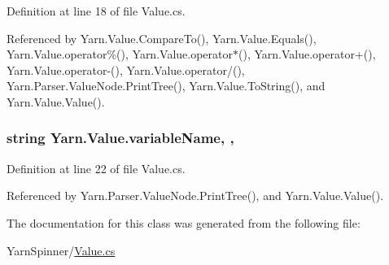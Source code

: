 Definition at line 18 of file Value.\-cs.



Referenced by Yarn.\-Value.\-Compare\-To(), Yarn.\-Value.\-Equals(), Yarn.\-Value.\-operator\%(), Yarn.\-Value.\-operator$\ast$(), Yarn.\-Value.\-operator+(), Yarn.\-Value.\-operator-\/(), Yarn.\-Value.\-operator/(), Yarn.\-Parser.\-Value\-Node.\-Print\-Tree(), Yarn.\-Value.\-To\-String(), and Yarn.\-Value.\-Value().

\hypertarget{a00177_a8ee2b09b7d28eaf97bf63c74d0023bfd}{
\subsubsection[{variable\-Name}]{\setlength{\rightskip}{0pt plus 5cm}string Yarn.\-Value.\-variable\-Name\hspace{0.3cm}{\ttfamily [get]}, {\ttfamily [set]}, {\ttfamily [package]}}}\label{a00177_a8ee2b09b7d28eaf97bf63c74d0023bfd}


Definition at line 22 of file Value.\-cs.



Referenced by Yarn.\-Parser.\-Value\-Node.\-Print\-Tree(), and Yarn.\-Value.\-Value().



The documentation for this class was generated from the following file\-:\begin{DoxyCompactItemize}
\item 
Yarn\-Spinner/\hyperlink{a00297}{Value.\-cs}\end{DoxyCompactItemize}
